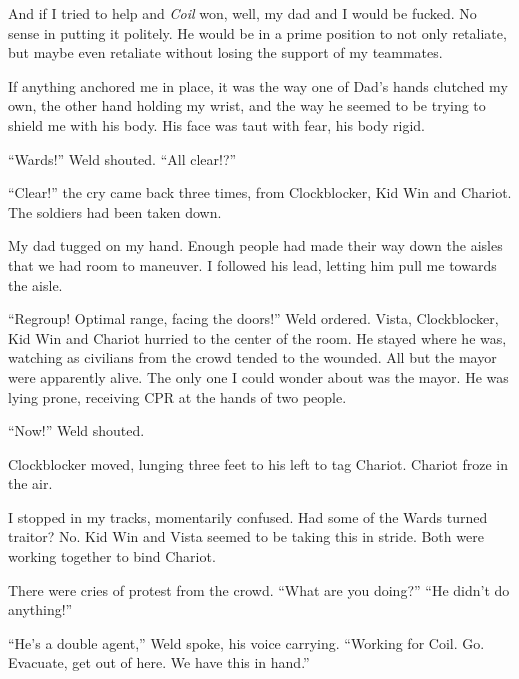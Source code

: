 And if I tried to help and \emph{Coil} won, well, my dad and I would be fucked.  No sense in putting it politely.  He would be in a prime position to not only retaliate, but maybe even retaliate without losing the support of my teammates.



If anything anchored me in place, it was the way one of Dad's hands clutched my own, the other hand holding my wrist, and the way he seemed to be trying to shield me with his body.  His face was taut with fear, his body rigid.



``Wards!''  Weld shouted.  ``All clear!?''



``Clear!''  the cry came back three times, from Clockblocker, Kid Win and Chariot.  The soldiers had been taken down.



My dad tugged on my hand.  Enough people had made their way down the aisles that we had room to maneuver.  I followed his lead, letting him pull me towards the aisle.



``Regroup!  Optimal range, facing the doors!''  Weld ordered.  Vista, Clockblocker, Kid Win and Chariot hurried to the center of the room.  He stayed where he was, watching as civilians from the crowd tended to the wounded.  All but the mayor were apparently alive.  The only one I could wonder about was the mayor.  He was lying prone, receiving CPR at the hands of two people.



``Now!''  Weld shouted.



Clockblocker moved, lunging three feet to his left to tag Chariot.  Chariot froze in the air.



I stopped in my tracks, momentarily confused.  Had some of the Wards turned traitor?  No.  Kid Win and Vista seemed to be taking this in stride.  Both were working together to bind Chariot.



There were cries of protest from the crowd.  ``What are you doing?''  ``He didn't do anything!''



``He's a double agent,'' Weld spoke, his voice carrying.  ``Working for Coil.  Go.  Evacuate, get out of here.  We have this in hand.''



